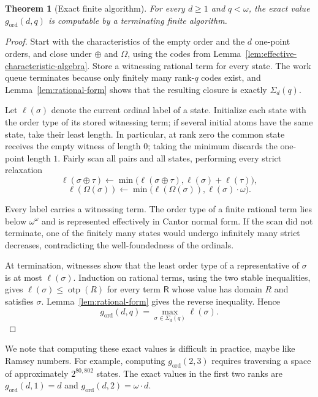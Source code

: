 \documentclass{amsart}
\newtheorem{theorem}{Theorem}
\theoremstyle{definition}
\begin{document}
\begin{theorem}[Exact finite algorithm]\label{thm:exact-algorithm}
    For every $d\geq1$ and $q<\omega$, the exact value $g_{\mathrm{ord}}(d,q)$ is computable by a terminating finite algorithm.
\end{theorem}
\begin{proof}
    Start with the characteristics of the empty order and the $d$ one-point orders, and close under $\oplus$ and $\Omega$, using the codes from Lemma~\ref{lem:effective-characteristic-algebra}. Store a witnessing rational term for every state. The work queue terminates because only finitely many rank-$q$ codes exist, and Lemma~\ref{lem:rational-form} shows that the resulting closure is exactly $\Sigma_d(q)$.

    Let $\ell(\sigma)$ denote the current ordinal label of a state. Initialize each state with the order type of its stored witnessing term; if several initial atoms have the same state, take their least length. In particular, at rank zero the common state receives the empty witness of length $0$; taking the minimum discards the one-point length $1$. Fairly scan all pairs and all states, performing every strict relaxation
    $$\ell(\sigma\oplus\tau)\leftarrow\min\bigl(\ell(\sigma\oplus\tau),\ell(\sigma)+\ell(\tau)\bigr),$$
    $$\ell(\Omega(\sigma))\leftarrow\min\bigl(\ell(\Omega(\sigma)),\ell(\sigma)\cdot\omega\bigr).$$
    
    Every label carries a witnessing term. The order type of a finite rational term lies below $\omega^\omega$ and is represented effectively in Cantor normal form.  If the scan did not terminate, one of the finitely many states would undergo infinitely many strict decreases, contradicting the well-foundedness of the ordinals.

    At termination, witnesses show that the least order type of a representative of $\sigma$ is at most $\ell(\sigma)$. Induction on rational terms, using the two stable inequalities, gives $\ell(\sigma)\leq\operatorname{otp}(R)$ for every term $\mathsf R$ whose value has domain $R$ and satisfies $\sigma$. Lemma~\ref{lem:rational-form} gives the reverse inequality. Hence
    $$g_{\mathrm{ord}}(d,q)=\max_{\sigma\in\Sigma_d(q)}\ell(\sigma).$$
\end{proof}


We note that computing these exact values is difficult in practice, maybe like Ramsey numbers. For example, computing $g_{\mathrm{ord}}(2,3)$ requires traversing a space of approximately $2^{80,802}$ states. The exact values in the first two ranks are $g_{\mathrm{ord}}(d,1)=d$ and $g_{\mathrm{ord}}(d,2)=\omega\cdot d$.
\end{document}
